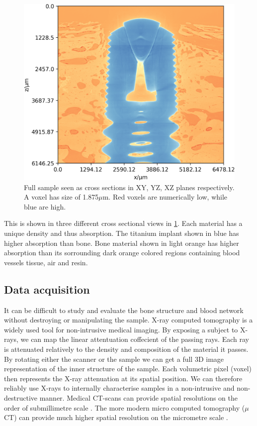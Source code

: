 \begin{figure}
\includegraphics[width=\columnwidth]{figures/770c_pag-full-xz-1x.png}
\caption{Full sample seen as cross sections in XY, YZ, XZ planes respectively. A voxel has size of
1.875$\mu$m. Red voxels are numerically low, while blue are high.}
\label{fig:3viewsample}
\end{figure}

This is shown in three different cross sectional views
in \cref{fig:3viewsample}. Each material has a unique density and thus absorption. The titanium
implant shown in blue has higher absorption than bone. Bone material shown in light orange has
higher absorption than its sorrounding dark orange colored regions containing blood vessels
tissue, air and resin.

\subsection{Data acquisition}

It can be difficult to study and evaluate the bone structure and blood network without destroying
or manipulating the sample. X-ray computed tomography is a widely used tool for non-intrusive medical
imaging. By exposing a subject to X-rays, we can map the linear attentuation coffecient of the passing
rays. Each ray is attenuated relatively to the density and composition of the material it passes.
By rotating either the scanner or the sample we can get a full 3D image representation of the inner
structure of the sample. Each volumetric pixel (voxel) then represents the X-ray attenuation at its
spatial position. We can therefore reliably use X-rays to internally characterise samples in a
non-intrusive and non-destructive manner. Medical CT-scans can provide spatial resolutions on the
order of submillimetre scale \citep{medicalct}. The more modern micro computed tomography ($\mu$CT)
can provide much higher spatial resolution on the micrometre scale \citep{srexptime}.

